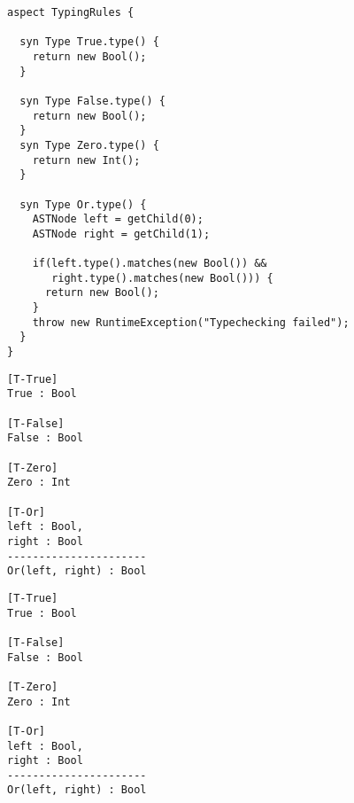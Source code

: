 \documentclass[nofilelist]{cslthse-msc}
\begin{document}
{
  }

\pagebreak
\begin{lstlisting}[language=jrag]
aspect TypingRules {

  syn Type True.type() {
    return new Bool();
  }

  syn Type False.type() {
    return new Bool();
  }
  syn Type Zero.type() {
    return new Int();
  }

  syn Type Or.type() {
    ASTNode left = getChild(0);
    ASTNode right = getChild(1);

    if(left.type().matches(new Bool()) &&
       right.type().matches(new Bool())) {
      return new Bool();
    }
    throw new RuntimeException("Typechecking failed");
  }
}
\end{lstlisting}

\begin{lstlisting}[]
[T-True]
True : Bool

[T-False]
False : Bool

[T-Zero]
Zero : Int

[T-Or]
left : Bool,
right : Bool
----------------------
Or(left, right) : Bool
\end{lstlisting}

\begin{lstlisting}[]
[T-True]
True : Bool

[T-False]
False : Bool

[T-Zero]
Zero : Int

[T-Or]
left : Bool,
right : Bool
----------------------
Or(left, right) : Bool
\end{lstlisting}
\end{document}
